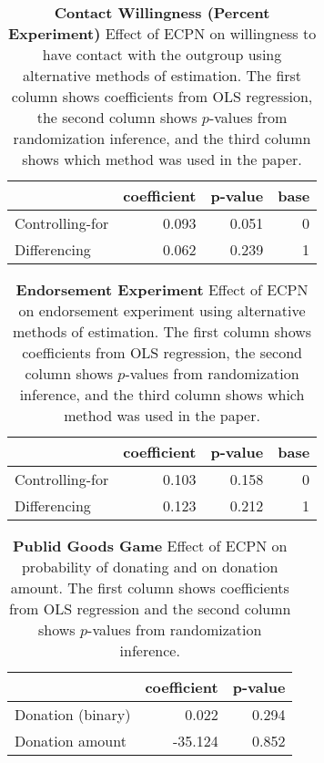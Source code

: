 \documentclass[
]{article}
\begin{document}
\begin{table}[H]
\begin{center}
\label{tab:percExp_tab}
\caption{\textbf{Contact Willingness (Percent Experiment)} Effect of ECPN on willingness to have contact with the outgroup using alternative methods of estimation. The first column shows coefficients from OLS regression, the second column shows $p$-values from randomization inference, and the third column shows which method was used in the paper.}
\smallskip

\begin{tabular}{l|r|r|r}
\hline
  & coefficient & p-value & base\\
\hline
Controlling-for & 0.093 & 0.051 & 0\\
\hline
Differencing & 0.062 & 0.239 & 1\\
\hline
\end{tabular}


\end{center}
\end{table}

\begin{table}[H]
\begin{center}
\label{tab:endExp_tab}
\caption{\textbf{Endorsement Experiment} Effect of ECPN on endorsement experiment using alternative methods of estimation. The first column shows coefficients from OLS regression, the second column shows $p$-values from randomization inference, and the third column shows which method was used in the paper.}
\smallskip

\begin{tabular}{l|r|r|r}
\hline
  & coefficient & p-value & base\\
\hline
Controlling-for & 0.103 & 0.158 & 0\\
\hline
Differencing & 0.123 & 0.212 & 1\\
\hline
\end{tabular}


\end{center}
\end{table}

\begin{table}[H]
\begin{center}
\label{tab:pgg_tab}
\caption{\textbf{Publid Goods Game} Effect of ECPN on probability of donating and on donation amount. The first column shows coefficients from OLS regression and the second column shows $p$-values from randomization inference.}
\smallskip

\begin{tabular}{l|r|r}
\hline
  & coefficient & p-value\\
\hline
Donation (binary) & 0.022 & 0.294\\
\hline
Donation amount & -35.124 & 0.852\\
\hline
\end{tabular}


\end{center}
\end{table}
\end{document}
